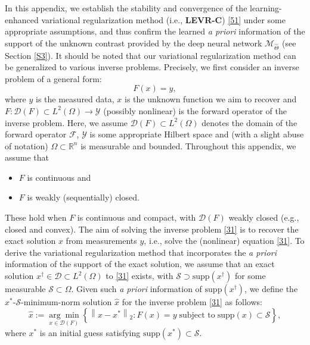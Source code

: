 \documentclass[11pt]{article}
\newcommand{\wih}{\widehat}
\begin{document}
In this appendix, we establish the stability and convergence of the learning-enhanced variational regularization method (i.e., \textbf{LEVR-C}) \eqref{51} under some appropriate assumptions, and thus confirm the learned \textit{a priori} information of the support of the unknown contrast provided by the deep neural network $ \mathcal{M}_{\wih{\Theta}} $ (see Section \ref{S3}).
It should be noted that our variational regularization method can be generalized to various inverse problems.
Precisely, we first consider an inverse problem of a general form:
\begin{equation}\label{31}
F(x) = y,
\end{equation}
where $ y $ is the measured data, $ x $ is the unknown function we aim to recover and $ F: \mathcal{D}(F)\subset L^2(\Omega)\to \mathcal{Y} $ (possibly nonlinear) is the forward operator of the inverse problem.
Here, we assume $ \mathcal{D}(F)\subset L^2(\Omega) $ denotes the domain of the forward operator $ \mathcal{F} $, $ \mathcal{Y} $ is some appropriate Hilbert space and (with a slight abuse of notation) $ \Omega\subset \mathbb{R}^n $ is measurable and bounded.
Throughout this appendix, we assume that
\begin{itemize}
\item 
$ F $ is continuous and
\item 
$ F $ is weakly (sequentially) closed.
\end{itemize}
These hold when $ F $ is continuous and compact, with $ \mathcal{D}(F) $ weakly closed (e.g., closed and convex).
The aim of solving the inverse problem \eqref{31} is to recover the exact solution $ x $ from measurements $ y $, i.e., solve the (nonlinear) equation \eqref{31}.
To derive the variational regularization method that incorporates the \textit{a priori} information of the support of the exact solution, we assume that an exact solution $ x^\dagger\in\mathcal{D}\subset L^2(\Omega) $ to \eqref{31} exists, with $\mathcal{S}\supset\mathrm{supp}(x^\dagger)$ for some measurable $ \mathcal{S}\subset \Omega $. 
Given such \textit{a priori} information of $ \mathrm{supp}(x^\dagger) $, we define the $ x^* $-$\mathcal{S}$-minimum-norm solution $ \hat{x} $ for the inverse problem \eqref{31} as follows:
\begin{displaymath}
\hat{x} := \underset{x\in \mathcal{D}(F)}{\arg\min}\left\{\left\|x - x^*\right\|_2: F(x) = y\;\text{subject to}\; \mathrm{supp}(x)\subset\mathcal{S}\right\},
\end{displaymath}
where $ x^* $ is an initial guess satisfying $ \mathrm{supp}(x^*)\subset\mathcal{S} $.
\end{document}
